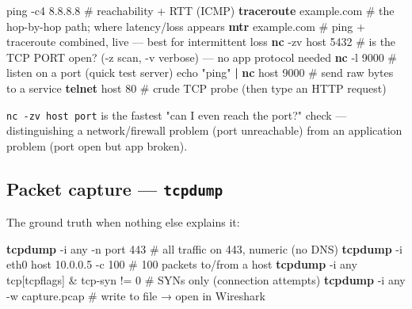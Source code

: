 \documentclass[11pt]{article}
\newenvironment{Shaded}{\begin{snugshade}}{\end{snugshade}}
\newcommand{\AttributeTok}[1]{\textcolor[rgb]{0.16,0.50,0.73}{#1}}
\newcommand{\BuiltInTok}[1]{\textcolor[rgb]{0.50,0.55,0.55}{#1}}
\newcommand{\CommentTok}[1]{\textcolor[rgb]{0.48,0.49,0.49}{#1}}
\newcommand{\ExtensionTok}[1]{\textcolor[rgb]{0.00,0.60,1.00}{\textbf{#1}}}
\newcommand{\FunctionTok}[1]{\textcolor[rgb]{0.56,0.27,0.68}{#1}}
\newcommand{\KeywordTok}[1]{\textcolor[rgb]{0.81,0.81,0.76}{\textbf{#1}}}
\newcommand{\NormalTok}[1]{\textcolor[rgb]{0.81,0.81,0.76}{#1}}
\newcommand{\StringTok}[1]{\textcolor[rgb]{0.96,0.31,0.31}{#1}}
\begin{document}
\begin{Shaded}
\begin{Highlighting}[]
\FunctionTok{ping} \AttributeTok{{-}c4}\NormalTok{ 8.8.8.8            }\CommentTok{\# reachability + RTT (ICMP)}
\ExtensionTok{traceroute}\NormalTok{ example.com     }\CommentTok{\# the hop{-}by{-}hop path; where latency/loss appears}
\ExtensionTok{mtr}\NormalTok{ example.com            }\CommentTok{\# ping + traceroute combined, live — best for intermittent loss}
\ExtensionTok{nc} \AttributeTok{{-}zv}\NormalTok{ host 5432           }\CommentTok{\# is the TCP PORT open? ({-}z scan, {-}v verbose) — no app protocol needed}
\ExtensionTok{nc} \AttributeTok{{-}l}\NormalTok{ 9000                 }\CommentTok{\# listen on a port (quick test server)}
\BuiltInTok{echo} \StringTok{"ping"} \KeywordTok{|} \ExtensionTok{nc}\NormalTok{ host 9000 }\CommentTok{\# send raw bytes to a service}
\ExtensionTok{telnet}\NormalTok{ host 80             }\CommentTok{\# crude TCP probe (then type an HTTP request)}
\end{Highlighting}
\end{Shaded}

\texttt{nc\ -zv\ host\ port} is the fastest "can I even reach the port?" check --- distinguishing a network/firewall problem (port unreachable) from an application problem (port open but app broken).

\subsection{\texorpdfstring{Packet capture --- \texttt{tcpdump}}{Packet capture --- tcpdump}}\label{packet-capture--tcpdump}

The ground truth when nothing else explains it:


\begin{Shaded}
\begin{Highlighting}[]
\ExtensionTok{tcpdump} \AttributeTok{{-}i}\NormalTok{ any }\AttributeTok{{-}n}\NormalTok{ port 443                 }\CommentTok{\# all traffic on 443, numeric (no DNS)}
\ExtensionTok{tcpdump} \AttributeTok{{-}i}\NormalTok{ eth0 host 10.0.0.5 }\AttributeTok{{-}c}\NormalTok{ 100       }\CommentTok{\# 100 packets to/from a host}
\ExtensionTok{tcpdump} \AttributeTok{{-}i}\NormalTok{ any }\StringTok{\textquotesingle{}tcp[tcpflags] \& tcp{-}syn != 0\textquotesingle{}}  \CommentTok{\# SYNs only (connection attempts)}
\ExtensionTok{tcpdump} \AttributeTok{{-}i}\NormalTok{ any }\AttributeTok{{-}w}\NormalTok{ capture.pcap             }\CommentTok{\# write to file → open in Wireshark}
\end{Highlighting}
\end{Shaded}
\end{document}
